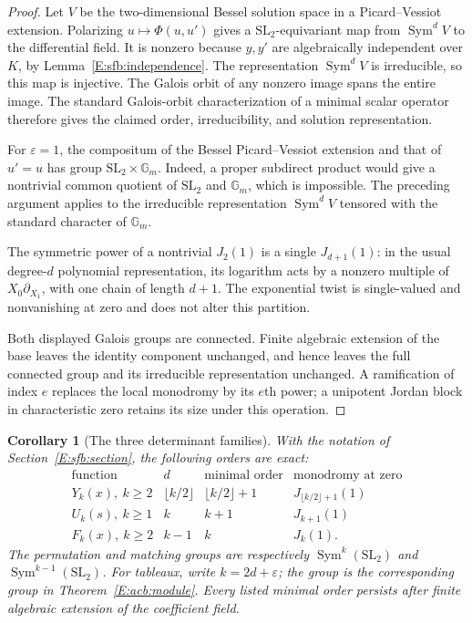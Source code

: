 \documentclass[11pt,a4paper]{article}
\newtheorem{corollary}[theorem]{Corollary}
\theoremstyle{definition}
\theoremstyle{remark}
\numberwithin{equation}{section}
\begin{document}
\begin{proof}
Let $V$ be the two-dimensional Bessel solution space in a
Picard--Vessiot extension.  Polarizing $u\mapsto\Phi(u,u')$ gives
a $\mathrm{SL}_2$-equivariant map from $\operatorname{Sym}^dV$
to the differential field.  It is nonzero because $y,y'$ are
algebraically independent over $K$, by Lemma~\ref{E:sfb:independence}.
The representation $\operatorname{Sym}^dV$ is irreducible,
so this map is injective.  The Galois orbit of any nonzero image
spans the entire image.  The standard Galois-orbit characterization
of a minimal scalar operator therefore gives the claimed order,
irreducibility, and solution representation.

For $\varepsilon=1$, the compositum of the Bessel
Picard--Vessiot extension and that of $u'=u$ has group
$\mathrm{SL}_2\times\mathbb G_m$.  Indeed, a proper subdirect
product would give a nontrivial common quotient of
$\mathrm{SL}_2$ and $\mathbb G_m$, which is impossible.
The preceding argument applies to the irreducible representation
$\operatorname{Sym}^dV$ tensored with the standard character of
$\mathbb G_m$.

The symmetric power of a nontrivial $J_2(1)$ is a single
$J_{d+1}(1)$: in the usual degree-$d$ polynomial representation,
its logarithm acts by a nonzero multiple of $X_0\partial_{X_1}$,
with one chain of length $d+1$.  The exponential twist is
single-valued and nonvanishing at zero and does not alter this
partition.

Both displayed Galois groups are connected.  Finite algebraic
extension of the base leaves the identity component unchanged,
and hence leaves the full connected group and its irreducible
representation unchanged.  A ramification of index $e$ replaces
the local monodromy by its $e$th power; a unipotent Jordan block
in characteristic zero retains its size under this operation.
\end{proof}

\begin{corollary}[The three determinant families]\label{E:acb:families}
With the notation of Section~\ref{E:sfb:section}, the following orders are exact:
\[
\begin{array}{c|c|c|c}
 \text{function}&d&\text{minimal order}&\text{monodromy at zero}\\ \hline
 Y_k(x),\ k\ge2&\lfloor k/2\rfloor&\lfloor k/2\rfloor+1
                                  &J_{\lfloor k/2\rfloor+1}(1)\\
 U_k(s),\ k\ge1&k&k+1&J_{k+1}(1)\\
 F_k(x),\ k\ge2&k-1&k&J_k(1).
\end{array}
\]
The permutation and matching groups are respectively
$\operatorname{Sym}^{k}(\mathrm{SL}_2)$ and
$\operatorname{Sym}^{k-1}(\mathrm{SL}_2)$.
For tableaux, write $k=2d+\varepsilon$; the group is the
corresponding group in Theorem~\ref{E:acb:module}.
Every listed minimal order persists after finite algebraic
extension of the coefficient field.
\end{corollary}
\end{document}

